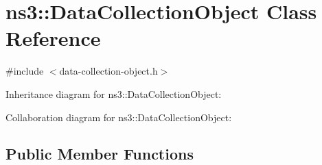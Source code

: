 \hypertarget{classns3_1_1DataCollectionObject}{}\section{ns3\+:\+:Data\+Collection\+Object Class Reference}
\label{classns3_1_1DataCollectionObject}


{\ttfamily \#include $<$data-\/collection-\/object.\+h$>$}



Inheritance diagram for ns3\+:\+:Data\+Collection\+Object\+:


Collaboration diagram for ns3\+:\+:Data\+Collection\+Object\+:
\subsection*{Public Member Functions}
